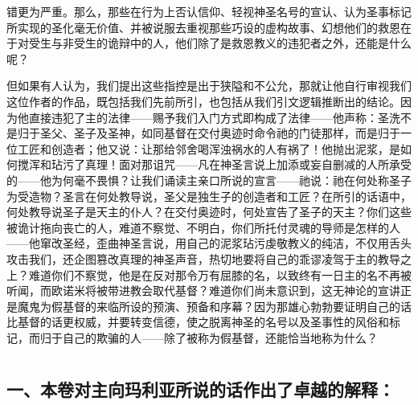 错更为严重。那么，那些在行为上否认信仰、轻视神圣名号的宣认、认为圣事标记所实现的圣化毫无价值、并被说服去重视那些巧设的虚构故事、幻想他们的救恩在于对受生与非受生的诡辩中的人，他们除了是救恩教义的违犯者之外，还能是什么呢？\par

但如果有人认为，我们提出这些指控是出于狭隘和不公允，那就让他自行审视我们这位作者的作品，既包括我们先前所引，也包括从我们引文逻辑推断出的结论。因为他直接违犯了主的法律——赐予我们入门方式即构成了法律——他声称：圣洗不是归于圣父、圣子及圣神，如同基督在交付奥迹时命令祂的门徒那样，而是归于一位工匠和创造者；他又说：让那给邻舍喝浑浊祸水的人有祸了！他抛出泥浆，是如何搅浑和玷污了真理！面对那诅咒——凡在神圣言说上加添或妄自删减的人所承受的——他为何毫不畏惧？让我们诵读主亲口所说的宣言——祂说：祂在何处称圣子为受造物？圣言在何处教导说，圣父是独生子的创造者和工匠？在所引的话语中，何处教导说圣子是天主的仆人？在交付奥迹时，何处宣告了圣子的天主？你们这些被诡计拖向丧亡的人，难道不察觉、不明白，你们所托付灵魂的导师是怎样的人——他窜改圣经，歪曲神圣言说，用自己的泥浆玷污虔敬教义的纯洁，不仅用舌头攻击我们，还企图篡改真理的神圣声音，热切地要将自己的乖谬凌驾于主的教导之上？难道你们不察觉，他是在反对那令万有屈膝的名，以致终有一日主的名不再被听闻，而欧诺米将被带进教会取代基督？难道你们尚未意识到，这无神论的宣讲正是魔鬼为假基督的来临所设的预演、预备和序幕？因为那雄心勃勃要证明自己的话比基督的话更权威，并要转变信德，使之脱离神圣的名号以及圣事性的风俗和标记，而归于自己的欺骗的人——除了被称为假基督，还能恰当地称为什么？\par



\section{}


\subsection{一、本卷对主向玛利亚所说的话作出了卓越的解释：}

